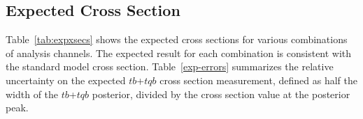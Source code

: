 %
%
%

\vspace{-0.1in}

\subsection{Expected Cross Section}

Table~\ref{tab:expxsecs} shows the expected cross sections for various
combinations of analysis channels. The expected result for each
combination is consistent with the standard model cross
section. Table~\ref{exp-errors} summarizes the relative uncertainty on
the expected $tb$+$tqb$ cross section measurement, defined as half the
width of the $tb$+$tqb$ posterior, divided by the cross section value
at the posterior peak.

